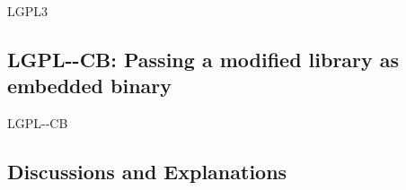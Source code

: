 \begin{license}{LGPL3}
\subsection{LGPL-\ver-CB: Passing a modified library as embedded binary}
\begin{lsuc}{LGPL-\ver-CB}

  \useCaseB

  \begin{lsucrequires}
    \lsucmandatory{\keepLicensingElements}
    \lsucmandatory{\lgplthreeEnsureCopyrightNoticeBinary}
    \lsucmandatory{\giveLicense}\passingFilesCorrectly
    \lsucmandatory{\makeEmbeddedSourceAvailable}
    \lsucmandatory{\describeHowToGetSource}
    \lsucmandatory{\addToCopyrightDialogLibWeak}
    \lsucmandatory{\markEmbeddedModifications}
    \lsucmandatory{\arrangeEmbeddedChanges}\howToApplyTheseTerms
    \lsucmandatory{\keepStructuralIndependence}
    \lsucmandatory{\allowRelinking}
    \lsucoptional{\createChangelog}  
    \lsucoptional{\addToDocumentation}
    \lsucoptional{\retainCopyrightNotices}
  \end{lsucrequires}

  \begin{lsucprohibits}
    \lsucitem{\noPatentLitigation}
  \end{lsucprohibits}
\end{lsuc}

\end{license}


\subsection{Discussions and Explanations}

\newcommand{\lgplTwoAndGplThree}[2]{\footnote{%
    For LGPL-2.1 see \cite[cf.][\nopage wp.\ #1]{Lgpl21OsiLicense1999a}.
    \par\noindent
    For GPL-3.0, which is included in the LGPL-3.0, see \cite[cf.][\nopage
      wp.\ #2]{Gpl30OsiLicense2007a}.}} 

\newcommand{\lgplTwoAndThree}[2]{\footnote{%
    For LGPL-2.1 see \cite[cf.][\nopage wp.\ #1]{Lgpl21OsiLicense1999a}.
    \par\noindent
    For LGPL-3.0 see \cite[cf.][\nopage wp.\ #2]{Lgpl30OsiLicense2007a}.}}

